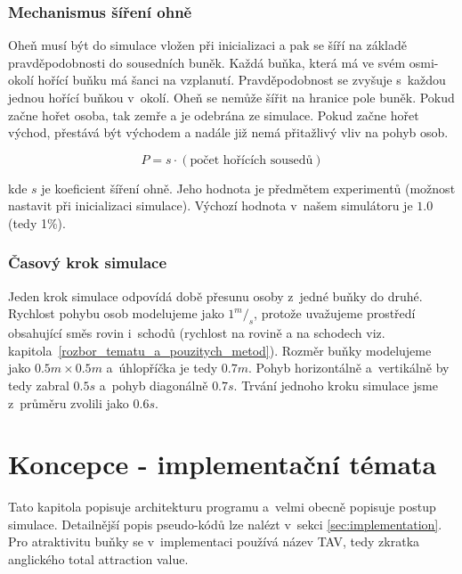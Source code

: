 \documentclass[11pt, titlepage, a4paper]{article}
\begin{document}
        \subsubsection{Mechanismus šíření ohně}
        Oheň musí být do simulace vložen při inicializaci a pak se šíří na základě pravděpodobnosti do sousedních buněk. Každá buňka, která má ve svém osmi-okolí hořící buňku má šanci na vzplanutí. Pravděpodobnost se zvyšuje s~každou jednou hořící buňkou v~okolí. Oheň se nemůže šířit na hranice pole buněk. Pokud začne hořet osoba, tak zemře a je odebrána ze simulace. Pokud začne hořet východ, přestává být východem a nadále již nemá přitažlivý vliv na pohyb osob.

        \begin{equation}
        \label{eq_P}
        P = s \cdot (\textrm{počet hořících sousedů})
        \end{equation}

        kde $s$ je koeficient šíření ohně. Jeho hodnota je předmětem experimentů (možnost nastavit při inicializaci simulace). Výchozí hodnota v~našem simulátoru je $1.0$ (tedy 1\%).\\

        \subsubsection{Časový krok simulace}
        Jeden krok simulace odpovídá době přesunu osoby z~jedné buňky do druhé. Rychlost pohybu osob modelujeme jako $1^m/_s$, protože uvažujeme prostředí obsahující směs rovin i~schodů (rychlost na rovině a na schodech viz. kapitola~\ref{rozbor_tematu_a_pouzitych_metod}). Rozměr buňky modelujeme jako $0.5m \times 0.5m$ a~úhlopříčka je tedy $0.7m$. Pohyb horizontálně a~vertikálně by tedy zabral $0.5s$ a~pohyb diagonálně $0.7s$. Trvání jednoho kroku simulace jsme z~průměru zvolili jako $0.6s$.

\section{Koncepce - implementační témata}
    Tato kapitola popisuje architekturu programu a~velmi obecně popisuje postup simulace. Detailnější popis pseudo-kódů lze nalézt v~sekci \ref{sec:implementation}. Pro atraktivitu buňky se v~implementaci používá název TAV, tedy zkratka anglického total attraction value.
\end{document}
